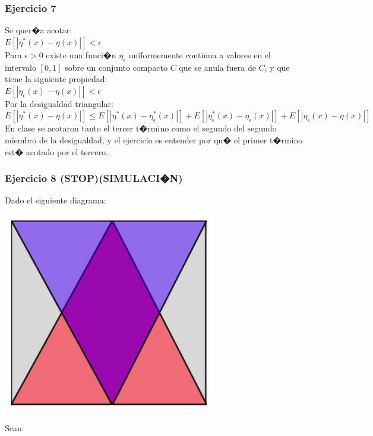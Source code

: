 \documentclass[a4paper,10pt]{article}
\begin{document}
	\subsubsection{Ejercicio 7}
	Se quer�a acotar:\\
	
	$E \left[ | \eta^{*} (x) - \eta(x)| \right]  < \epsilon  $	\\
	
	Para $\epsilon>0$ existe una funci�n $\eta_{\epsilon}$ uniformemente continua a valores en el intervalo $\left[ 0, 1 \right]$ sobre un conjunto compacto $C$ que se anula fuera de $C$, y que tiene la siguiente propiedad:\\
	$E[ |\eta_\epsilon(x) - \eta(x)| ] < \epsilon $ \\
	
	Por la desigualdad triangular:\\
	
	$E\left[ |\eta^*(x) - \eta(x)| \right] \leq E[ |\eta ^*(x) - \eta_\epsilon ^*(x)| ] + E[ |\eta^*_\epsilon(x) - \eta_\epsilon(x)| ] + E[ |\eta_\epsilon(x) - \eta(x)| ]$\\
		
	En clase se acotaron tanto el tercer t�rmino como el segundo del segundo miembro de la desigualdad, y el ejercicio es entender  por qu� el primer t�rmino est� acotado por el tercero.
	
	\subsubsection{Ejercicio 8 (STOP)(SIMULACI�N)}
	
	Dado el siguiente diagrama:
	\begin{center}
	\includegraphics[width=0.5\linewidth]{enunciado-ej8}
	\label{fig:enunciado-ej8}\\
	\end{center}
	
	Sean:\\
	
\end{document}
